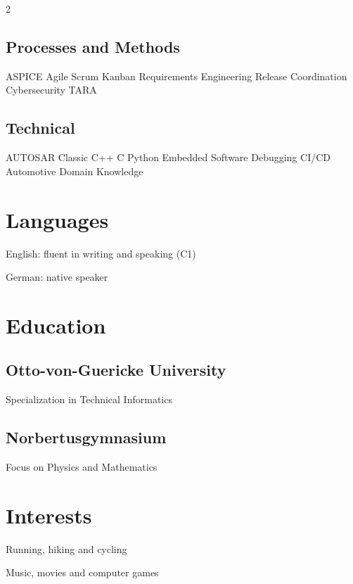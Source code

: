 \begin{paracol}{2}
\subsection{Processes and Methods}
\sectionsep
ASPICE \textbullet{} Agile \textbullet{} Scrum \textbullet{} Kanban \textbullet{} Requirements Engineering \textbullet{}
Release Coordination \textbullet{} Cybersecurity \textbullet{} TARA \\
\sectionsep
\subsection{Technical}
\sectionsep
AUTOSAR Classic \textbullet{} C++ \textbullet{} C \textbullet{} Python \textbullet{} Embedded Software \textbullet{}
Debugging \textbullet{} CI/CD \textbullet{} Automotive Domain Knowledge \\
\sectionsep


\section{Languages}
\begin{tightemize}
\item English: fluent in writing and speaking (C1)
\item German: native speaker
\end{tightemize}
\sectionsep


\section{Education}
\subsection{Otto-von-Guericke University}
Specialization in Technical Informatics \\
\sectionsep

\subsection{Norbertusgymnasium}
Focus on Physics and Mathematics
\sectionsep


\section{Interests}
\begin{tightemize}
\item Running, hiking and cycling
\item Music, movies and computer games
\end{tightemize}

\end{paracol}

